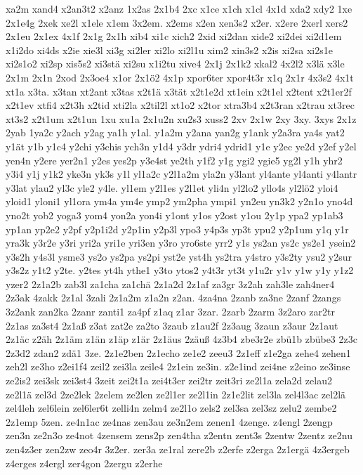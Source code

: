 {xa2m
xand4
x2an3t2
x2anz
1x2as
2x1b4
2xc
x1ce
x1ch
x1cl
4x1d
xda2
xdy2
1xe
2x1e4g
2xek
xe2l
x1ele
x1em
3x2em.
x2ems
x2en
xen3s2
x2er.
x2ere
2xerl
xers2
2x1eu
2x1ex
4x1f
2x1g
2x1h
xib4
xi1c
xich2
2xid
xi2dan
xide2
xi2dei
xi2d1em
x1i2do
xi4ds
x2ie
xie3l
xi3g
xi2ler
xi2lo
xi2l1u
xim2
xin3s2
x2is
xi2sa
xi2s1e
xi2s1o2
xi2sp
xis5s2
xi3stä
xi2su
x1i2tu
xive4
2x1j
2x1k2
xkal2
4x2l2
x3lä
x3le
2x1m
2x1n
2xod
2x3oe4
x1or
2x1ö2
4x1p
xpor6ter
xpor4t3r
x1q
2x1r
4x3s2
4x1t
xt1a
x3ta.
x3tan
xt2ant
x3tas
x2t1ä
x3tät
x2t1e2d
xt1ein
x2t1el
x2tent
x2t1er2f
x2t1ev
xtfi4
x2t3h
x2tid
xti2la
x2til2l
xt1o2
x2tor
xtra3b4
x2t3ran
x2trau
xt3rec
xt3s2
x2t1um
x2t1un
1xu
xu1a
2x1u2n
xu2s3
xuss2
2xv
2x1w
2xy
3xy.
3xys
2x1z
2yab
1ya2c
y2ach
y2ag
ya1h
y1al.
y1a2m
y2ana
yan2g
y1ank
y2a3ra
ya4s
yat2
y1ät
y1b
y1c4
y2chi
y3chis
ych3n
y1d4
y3dr
ydri4
ydrid1
y1e
y2ec
ye2d
y2ef
y2el
yen4n
y2ere
yer2n1
y2es
yes2p
y3e4st
ye2th
y1f2
y1g
ygi2
ygie5
yg2l
y1h
yhr2
y3i4
y1j
y1k2
yke3n
yk3s
y1l
yl1a2c
y2l1a2m
yla2n
y3lant
yl4ante
yl4anti
y4lantr
y3lat
ylau2
yl3c
yle2
y4le.
yl1em
y2l1es
y2l1et
yli4n
yl2lo2
yllo4s
yl2lö2
yloi4
yloid1
yloni1
yl1ora
ym4a
ym4e
ymp2
ym2pha
ympi1
yn2eu
yn3k2
y2n1o
yno4d
yno2t
yob2
yoga3
yom4
yon2a
yon4i
y1ont
y1os
y2ost
y1ou
2y1p
ypa2
yp1ab3
yp1an
yp2e2
y2pf
y2p1i2d
y2p1in
y2p3l
ypo3
y4p3s
yp3t
ypu2
y2p1um
y1q
y1r
yra3k
y3r2e
y3ri
yri2a
yri1e
yri3en
y3ro
yro6ste
yrr2
y1s
ys2an
ys2c
ys2e1
ysein2
y3s2h
y4s3l
ysme3
ys2o
ys2pa
ys2pi
yst2e
yst4h
ys2tra
y4stro
y3s2ty
ysu2
y2sur
y3s2z
y1t2
y2te.
y2tes
yt4h
ythe1
y3to
ytos2
y4t3r
yt3t
y1u2r
y1v
y1w
y1y
y1z2
yzer2
2z1a2b
zab3l
za1cha
za1chä
2z1a2d
2z1af
za3gr
3z2ah
zah3le
zah4ner4
2z3ak
4zakk
2z1al
3zali
2z1a2m
z1a2n
z2an.
4za4na
2zanb
za3ne
2zanf
2zangs
3z2ank
zan2ka
2zanr
zanti1
za4pf
z1aq
z1ar
3zar.
2zarb
2zarm
3z2aro
zar2tr
2z1as
za3st4
2z1aß
z3at
zat2e
za2to
3zaub
z1au2f
2z3aug
3zaun
z3aur
2z1aut
2z1äc
z2äh
2z1äm
z1än
z1äp
z1är
2z1äus
2zäuß
4z3b4
zbe3r2e
zbü1b
zbübe3
2z3c
2z3d2
zdan2
zdä1
3ze.
2z1e2ben
2z1echo
ze1e2
zeeu3
2z1eff
z1e2ga
zehe4
zehen1
zeh2l
ze3ho
z2ei1f4
zeil2
zei3la
zeile4
2z1ein
ze3in.
z2e1ind
zei4ne
z2eino
ze3inse
ze2is2
zei3sk
zei3st4
3zeit
zei2t1a
zei4t3er
zei2tr
zeit3ri
ze2l1a
zela2d
zelau2
ze2l1ä
zel3d
2ze2lek
2zelem
ze2len
ze2l1er
ze2l1in
2z1e2lit
zel3la
zel4l3ac
zel2lä
zel4leh
zel6lein
zel6ler6t
zelli4n
zelm4
ze2l1o
zels2
zel3sa
zel3sz
zelu2
zembe2
2z1emp
5zen.
ze4n1ac
ze4nas
zen3au
ze3n2em
zenen1
4zenge.
z4engl
2zengp
zen3n
ze2n3o
ze4not
4zensem
zens2p
zen4tha
z2entn
zent3s
2zentw
2zentz
ze2nu
zen4z3er
zen2zw
zeo4r
3z2er.
zer3a
ze1ral
zere2b
z2erfe
z2erga
2z1ergä
4z3ergeb
z4erges
z4ergl
zer4gon
2zergu
z2erhe
}
